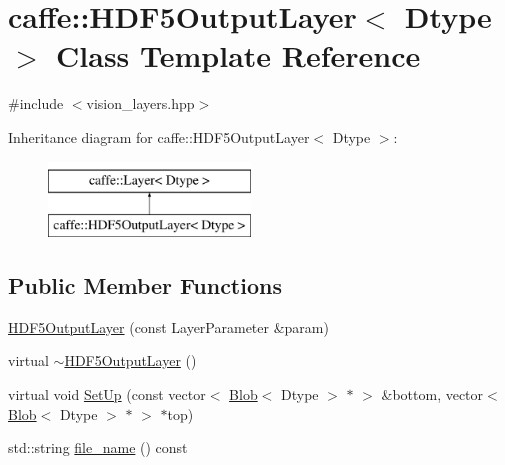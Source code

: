 \hypertarget{classcaffe_1_1_h_d_f5_output_layer}{\section{caffe\+:\+:H\+D\+F5\+Output\+Layer$<$ Dtype $>$ Class Template Reference}
\label{classcaffe_1_1_h_d_f5_output_layer}
}


{\ttfamily \#include $<$vision\+\_\+layers.\+hpp$>$}

Inheritance diagram for caffe\+:\+:H\+D\+F5\+Output\+Layer$<$ Dtype $>$\+:\begin{figure}[H]
\begin{center}
\leavevmode
\includegraphics[height=2.000000cm]{classcaffe_1_1_h_d_f5_output_layer}
\end{center}
\end{figure}
\subsection*{Public Member Functions}
\begin{DoxyCompactItemize}
\item 
\hyperlink{classcaffe_1_1_h_d_f5_output_layer_acf9e02d15a72cb6838e8fd2860e046b5}{H\+D\+F5\+Output\+Layer} (const Layer\+Parameter \&param)
\item 
virtual \hyperlink{classcaffe_1_1_h_d_f5_output_layer_a10ea92da7b4bd56dd01734ff62048132}{$\sim$\+H\+D\+F5\+Output\+Layer} ()
\item 
virtual void \hyperlink{classcaffe_1_1_h_d_f5_output_layer_ac30de09e62b1ad98c377f48a7c271ee7}{Set\+Up} (const vector$<$ \hyperlink{classcaffe_1_1_blob}{Blob}$<$ Dtype $>$ $\ast$ $>$ \&bottom, vector$<$ \hyperlink{classcaffe_1_1_blob}{Blob}$<$ Dtype $>$ $\ast$ $>$ $\ast$top)
\item 
std\+::string \hyperlink{classcaffe_1_1_h_d_f5_output_layer_aca8e3392384521de35e87618d3208571}{file\+\_\+name} () const 
\end{DoxyCompactItemize}
